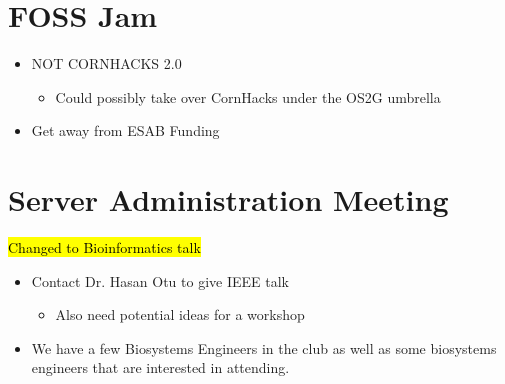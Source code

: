 \documentclass[12pt]{article}
\begin{document}
\section*{FOSS Jam}
   \begin{itemize}
       \item NOT CORNHACKS 2.0
       \begin{itemize}
            \item Could possibly take over CornHacks under the OS2G umbrella
        \end{itemize}
       \item Get away from ESAB Funding
   \end{itemize}

\section*{Server Administration Meeting}
\hl{Changed to Bioinformatics talk}
    \begin{itemize}
         \item Contact Dr. Hasan Otu to give IEEE talk
         \begin{itemize}
             \item Also need potential ideas for a workshop
         \end{itemize}
         \item We have a few Biosystems Engineers in the club as well as some biosystems engineers that are interested in attending.
    \end{itemize}
\end{document}
